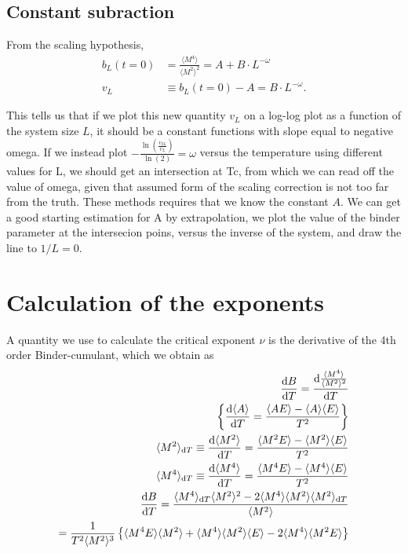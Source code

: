 \subsection{Constant subraction}
From the scaling hypothesis, 
\begin{align}
  b_L(t=0) &= \frac{\langle M^4 \rangle}{\langle M^2\rangle^2} = A + B\cdot L^{-\omega}\\
  v_L &\equiv b_L(t=0) -A = B\cdot L^{-\omega}.
\end{align}

This tells us that if we plot this new quantity $v_L$ on a log-log plot as a function of the system size $L$, it should be a constant functions with slope equal to negative omega.
If we instead plot $-\frac{\ln\left(\frac{v_{2L}}{v_L}\right)}{\ln(2)} = \omega$ versus the temperature using different values for L, we should get an intersection at Tc, from which we can read off the value of omega, given that assumed form of the scaling correction is not too far from the truth.
These methods requires that we know the constant $A$.
We can get a good starting estimation for A by extrapolation,
we plot the value of the binder parameter at the intersecion poins, versus the inverse of the system, and draw the line to $1/L = 0$.
\section{Calculation of the exponents}
A quantity we use to calculate the critical exponent $\nu$ is the derivative of the 4th order Binder-cumulant, which we obtain as 
\begin{align}
  \frac{\textrm{d} B}{\textrm{d} T} = \frac{\textrm{d} \frac{\langle M^4\rangle}{\langle M^2 \rangle^2}}{\textrm{d} T} \\
  \left\{\frac{\textrm{d} \langle A\rangle }{\textrm{d} T} = \frac{\langle A E\rangle  - \langle A\rangle \langle E\rangle }{T^2}\right\} \\
  \langle M^2\rangle _{\textrm{d} T} \equiv \frac{\textrm{d} \langle M^2\rangle }{\textrm{d} T} = \frac{\langle M^2E\rangle  - \langle M^2\rangle \langle E\rangle }{T^2} \\
  \langle M^4\rangle _{\textrm{d} T} \equiv \frac{\textrm{d} \langle M^4\rangle }{\textrm{d} T} = \frac{\langle M^4 E\rangle  - \langle M^4\rangle \langle E\rangle }{T^2} \\
  \frac{\textrm{d} B}{\textrm{d} T} = \frac{\langle M^4\rangle _{\textrm{d} T}\langle M^2\rangle ^2 - 2\langle M^4\rangle \langle M^2\rangle \langle M^2\rangle _{\textrm{d} T}}{\langle M^2\rangle } \\
  = \frac{1}{T^2 \langle M^2\rangle ^3}\left\{\langle M^4 E\rangle \langle M^2\rangle  + \langle M^4\rangle \langle M^2\rangle \langle E\rangle  - 2\langle M^4\rangle \langle M^2E\rangle \right\}
\end{align}

